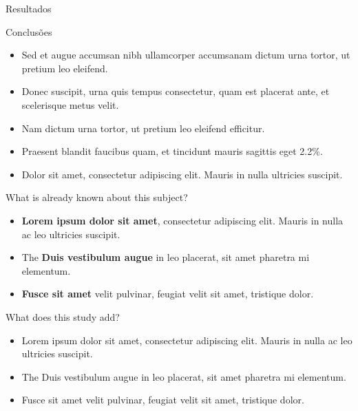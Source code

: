 \documentclass[final]{beamer}
\newlength{\colwidth}
\begin{document}
\begin{frame}[t]
\begin{columns}[t]
\begin{column}{\colwidth}
\begin{block}{Resultados}
    

\end{block}

   \begin{block}{Conclusões}
    \begin{itemize}
      \item Sed et augue accumsan nibh ullamcorper accumsanam dictum urna tortor, ut pretium leo eleifend.  
      \item Donec suscipit, urna quis tempus consectetur, quam est placerat ante, et scelerisque metus velit. 
      \item Nam dictum urna tortor, ut pretium leo eleifend efficitur.
      \item Praesent blandit faucibus quam, et tincidunt mauris sagittis eget 2.2\%.
      \item Dolor sit amet, consectetur adipiscing elit. Mauris in nulla ultricies suscipit.
    \end{itemize}
  \end{block}


  \begin{exampleblock}{What is already known about this subject?}

    \begin{itemize}
      \item \textbf{Lorem ipsum dolor sit amet}, consectetur adipiscing elit. Mauris in nulla ac leo ultricies suscipit.
      \item The \textbf{Duis vestibulum augue} in leo placerat, sit amet pharetra mi elementum.
      \item \textbf{Fusce sit amet} velit pulvinar, feugiat velit sit amet, tristique dolor.
    \end{itemize}

  \end{exampleblock}

  
  \begin{exampleblock}{What does this study add?}
    \begin{itemize}
      \item Lorem ipsum dolor sit amet, consectetur adipiscing elit. Mauris in nulla ac leo ultricies suscipit.
      \item The Duis vestibulum augue in leo placerat, sit amet pharetra mi elementum.
      \item Fusce sit amet velit pulvinar, feugiat velit sit amet, tristique dolor.
    \end{itemize}


\end{exampleblock}
\end{column}
\end{columns}
\end{frame}
\end{document}
